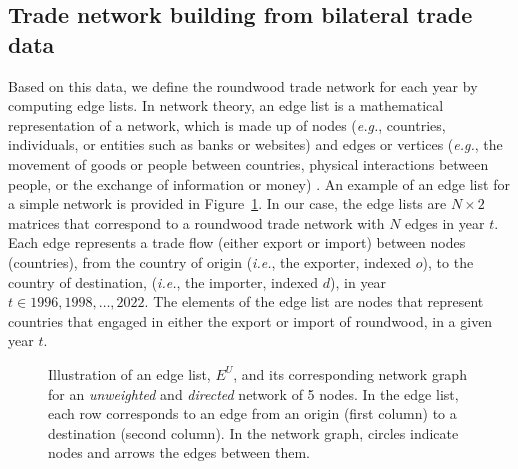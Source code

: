 \documentclass[
  authoryear,
  review,
  3p]{elsarticle}
\begin{document}
\subsection{Trade network building from bilateral trade
data}\label{trade-network-building-from-bilateral-trade-data}

Based on this data, we define the roundwood trade network for each year
by computing edge lists. In network theory, an edge list is a
mathematical representation of a network, which is made up of nodes
(\emph{e.g.}, countries, individuals, or entities such as banks or
websites) and edges or vertices (\emph{e.g.}, the movement of goods or
people between countries, physical interactions between people, or the
exchange of information or money)
\citep{albert2002statistical, newman2003structure}. An example of an
edge list for a simple network is provided in
Figure~\ref{fig-edge-list-unweighted}. In our case, the edge lists are
\(N \times 2\) matrices that correspond to a roundwood trade network
with \(N\) edges in year \(t\). Each edge represents a trade flow
(either export or import) between nodes (countries), from the country of
origin (\emph{i.e.}, the exporter, indexed \(o\)), to the country of
destination, (\emph{i.e.}, the importer, indexed \(d\)), in year
\(t \in {1996,1998,…,2022}\). The elements of the edge list are nodes
that represent countries that engaged in either the export or import of
roundwood, in a given year \(t\).

\begin{figure}[t]


\caption{\label{fig-edge-list-unweighted}Illustration of an edge list,
\(E^U\), and its corresponding network graph for an \textit{unweighted}
and \textit{directed} network of 5 nodes. In the edge list, each row
corresponds to an edge from an origin (first column) to a destination
(second column). In the network graph, circles indicate nodes and arrows
the edges between them.}

\end{figure}%
\end{document}
